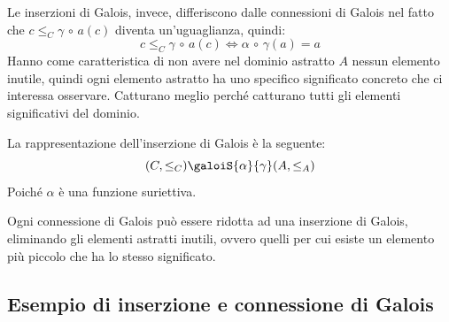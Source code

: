 Le inserzioni di Galois, invece, differiscono dalle connessioni di Galois nel fatto che 
$c \leq_C \gamma \, \circ \, a(c)$ diventa un'uguaglianza, quindi:
\[c \leq_C \gamma \, \circ \, a(c) \iff \alpha \, \circ \, \gamma(a) = a\]
Hanno come caratteristica di non avere nel dominio astratto $A$ nessun elemento inutile, 
quindi ogni elemento astratto ha uno specifico significato concreto che ci interessa 
osservare. Catturano meglio perché catturano tutti gli elementi significativi del dominio.

La rappresentazione dell'inserzione di Galois è la seguente:
\[(C, \leq_C) \galoiS{\alpha}{\gamma} (A, \leq_A)\]
Poiché $\alpha$ è una funzione suriettiva.

Ogni connessione di Galois può essere ridotta ad una inserzione di Galois, eliminando 
gli elementi astratti inutili, ovvero quelli per cui esiste un elemento più piccolo che 
ha lo stesso significato.
\subsection{Esempio di inserzione e connessione di Galois}

